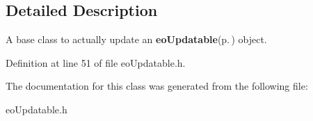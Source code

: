 \subsection{Detailed Description}
A base class to actually update an {\bf eo\-Updatable}{\rm (p.\,\pageref{classeo_updatable})} object. 



Definition at line 51 of file eo\-Updatable.h.

The documentation for this class was generated from the following file:\begin{CompactItemize}
\item 
eo\-Updatable.h\end{CompactItemize}
